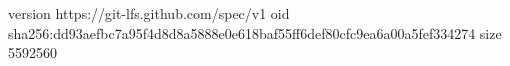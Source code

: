 version https://git-lfs.github.com/spec/v1
oid sha256:dd93aefbc7a95f4d8d8a5888e0e618baf55ff6def80cfc9ea6a00a5fef334274
size 5592560
